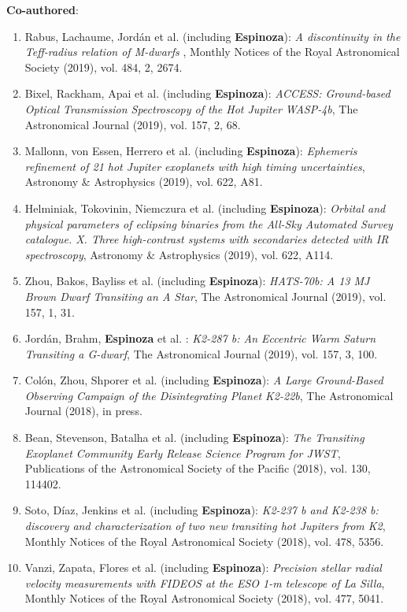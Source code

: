 \documentclass[12pt, a4paper]{article} %
\begin{document}
\begin{flushleft}
\textbf{Co-authored}:
\begin{enumerate}
\setlength\itemsep{0.05cm}
\item Rabus, Lachaume, Jord\'an et al. (including \textbf{Espinoza}): \textit{A discontinuity in the Teff-radius relation of M-dwarfs
}, Monthly Notices of the Royal Astronomical Society (2019), vol. 484, 2, 2674.
\item Bixel, Rackham, Apai et al. (including \textbf{Espinoza}): \textit{ACCESS: Ground-based Optical Transmission Spectroscopy of the Hot Jupiter WASP-4b}, The Astronomical Journal (2019), vol. 157, 2, 68.
\item Mallonn, von Essen, Herrero et al. (including \textbf{Espinoza}): \textit{Ephemeris refinement of 21 hot Jupiter exoplanets with high timing uncertainties}, Astronomy \& Astrophysics (2019), vol. 622, A81.
\item Helminiak, Tokovinin, Niemczura et al. (including \textbf{Espinoza}): \textit{Orbital and physical parameters of eclipsing binaries from the All-Sky Automated Survey catalogue. X. Three high-contrast systems with secondaries detected with IR spectroscopy}, Astronomy \& Astrophysics (2019), vol. 622, A114.
\item Zhou, Bakos, Bayliss et al. (including \textbf{Espinoza}): \textit{HATS-70b: A 13 MJ Brown Dwarf Transiting an A Star}, The Astronomical Journal (2019), vol. 157, 1, 31.
\item Jord\'an, Brahm, \textbf{Espinoza} et al. : \textit{K2-287 b: An Eccentric Warm Saturn Transiting a G-dwarf}, The Astronomical Journal (2019), vol. 157, 3, 100.
\item Col\'on, Zhou, Shporer et al. (including \textbf{Espinoza}): \textit{A Large Ground-Based Observing Campaign of the Disintegrating Planet K2-22b}, The Astronomical Journal (2018), in press.
\item Bean, Stevenson, Batalha et al. (including \textbf{Espinoza}): \textit{The Transiting Exoplanet Community Early Release Science Program for JWST}, Publications of the Astronomical Society of the Pacific (2018), vol. 130, 114402.
\item Soto, D\'iaz, Jenkins et al. (including \textbf{Espinoza}): \textit{K2-237 b and K2-238 b: discovery and characterization of two new transiting hot Jupiters from K2},  Monthly Notices of the Royal Astronomical Society (2018), vol. 478, 5356.
\item Vanzi, Zapata, Flores et al. (including \textbf{Espinoza}): \textit{Precision stellar radial velocity measurements with FIDEOS at the ESO 1-m telescope of La Silla},  Monthly Notices of the Royal Astronomical Society (2018), vol. 477, 5041.

\end{enumerate}
\end{flushleft}
\end{document}
